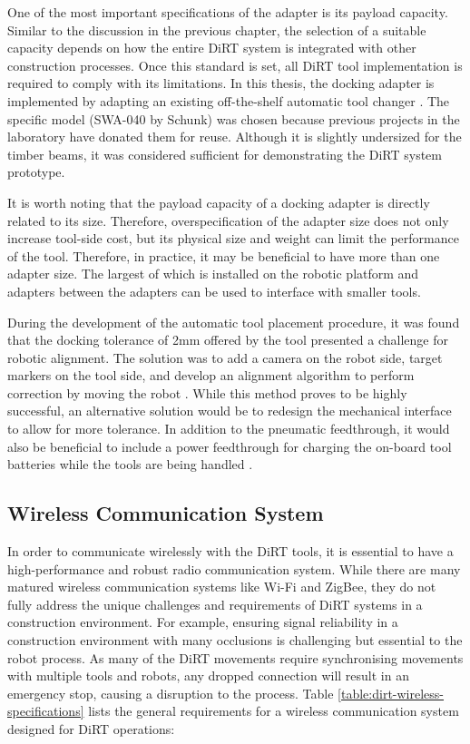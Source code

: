One of the most important specifications of the adapter is its payload capacity. Similar to the discussion in the previous chapter, the selection of a suitable capacity depends on how the entire DiRT system is integrated with other construction processes. Once this standard is set, all DiRT tool implementation is required to comply with its limitations. In this thesis, the docking adapter is implemented by adapting an existing off-the-shelf automatic tool changer . The specific model (SWA-040 by Schunk) was chosen because previous projects in the laboratory have donated them for reuse. Although it is slightly undersized for the timber beams, it was considered sufficient for demonstrating the DiRT system prototype. 

It is worth noting that the payload capacity of a docking adapter is directly related to its size. Therefore, overspecification of the adapter size does not only increase tool-side cost, but its physical size and weight can limit the performance of the tool. Therefore, in practice, it may be beneficial to have more than one adapter size. The largest of which is installed on the robotic platform and adapters between the adapters can be used to interface with smaller tools.

During the development of the automatic tool placement procedure, it was found that the docking tolerance of 2mm offered by the tool presented a challenge for robotic alignment. The solution was to add a camera on the robot side, target markers on the tool side, and develop an alignment algorithm to perform correction by moving the robot . While this method proves to be highly successful, an alternative solution would be to redesign the mechanical interface to allow for more tolerance. In addition to the pneumatic feedthrough, it would also be beneficial to include a power feedthrough for charging the on-board tool batteries while the tools are being handled . 

\FloatBarrier

\subsection{Wireless Communication System}
\label{subsection:discussion-wireless-communication-system}

In order to communicate wirelessly with the DiRT tools, it is essential to have a high-performance and robust radio communication system. While there are many matured wireless communication systems like Wi-Fi and ZigBee, they do not fully address the unique challenges and requirements of DiRT systems in a construction environment. For example, ensuring signal reliability in a construction environment with many occlusions is challenging but essential to the robot process. As many of the DiRT movements require synchronising movements with multiple tools and robots, any dropped connection will result in an emergency stop, causing a disruption to the process. Table \ref{table:dirt-wireless-specifications} lists the general requirements for a wireless communication system designed for DiRT operations:

